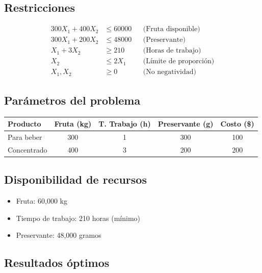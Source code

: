 \documentclass[12pt, a4paper, oneside]{book}
\theoremstyle{definition}
\begin{document}
\subsection{Restricciones}
\begin{align*}
300X_1 + 400X_2 &\leq 60000 && \text{(Fruta disponible)} \\
300X_1 + 200X_2 &\leq 48000 && \text{(Preservante)} \\
X_1 + 3X_2 &\geq 210 && \text{(Horas de trabajo)} \\
X_2 &\leq 2X_1 && \text{(Límite de proporción)} \\
X_1, X_2 &\geq 0 && \text{(No negatividad)}
\end{align*}

\subsection{Parámetros del problema}

\begin{table}
\centering
\begin{tabular}{lcccc}
\toprule
\textbf{Producto} & \textbf{Fruta (kg)} & \textbf{T. Trabajo (h)} & \textbf{Preservante (g)} & \textbf{Costo (\$)} \\
\midrule
Para beber        & 300                 & 1                       & 300                      & 100                \\
Concentrado       & 400                 & 3                       & 200                      & 200                \\
\bottomrule
\end{tabular}
\end{table}

\subsection{Disponibilidad de recursos}

\begin{itemize}
    \item Fruta: 60,000 kg
    \item Tiempo de trabajo: 210 horas (mínimo)
    \item Preservante: 48,000 gramos
\end{itemize}

\subsection{Resultados óptimos}
\end{document}
